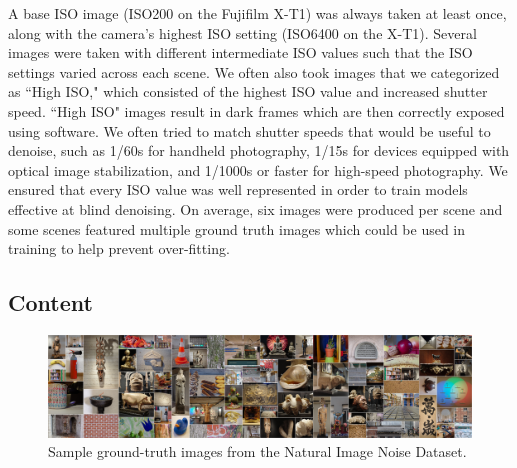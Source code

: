 A base ISO image (ISO200 on the Fujifilm X-T1) was always taken at least once, along with the camera's highest ISO setting (ISO6400 on the X-T1). Several images were taken with different intermediate ISO values such that the ISO settings varied across each scene. We often also took images that we categorized as ``High ISO," which consisted of the highest ISO value and increased shutter speed. ``High ISO" images result in dark frames which are then correctly exposed using software. We often tried to match shutter speeds that would be useful to denoise, such as 1/60s for handheld photography, 1/15s for devices equipped with optical image stabilization, and 1/1000s or faster for high-speed photography. We ensured that every ISO value was well represented in order to train models effective at blind denoising. On average, six images were produced per scene and some scenes featured multiple ground truth images which could be used in training to help prevent over-fitting.
\subsection{Content}
\begin{figure}
  \includegraphics[width=1\linewidth]{gfx/samplebanner.jpg}
   \caption{Sample ground-truth images from the Natural Image Noise Dataset.}
\label{fig:sampleimg}
\end{figure}

